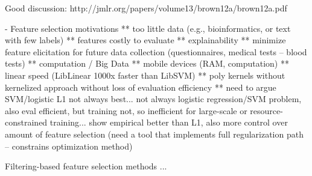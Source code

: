 Good discussion: http://jmlr.org/papers/volume13/brown12a/brown12a.pdf

- Feature selection motivations
** too little data (e.g., bioinformatics, or text with few labels)
** features costly to evaluate
** explainability
** minimize feature elicitation for future data collection (questionnaires, medical tests -- blood tests)
** computation / Big Data
** mobile devices (RAM, computation)
** linear speed (LibLinear 1000x faster than LibSVM)
** poly kernels without kernelized approach without loss of evaluation efficiency
** need to argue SVM/logistic L1 not always best... not always logistic regression/SVM problem, also eval efficient, but training not, so 
inefficient for large-scale or resource-constrained training... show empirical better than L1, also more control over amount of feature 
selection (need a tool that implements full regularization path -- constrains optimization method)


Filtering-based feature selection methods ...


